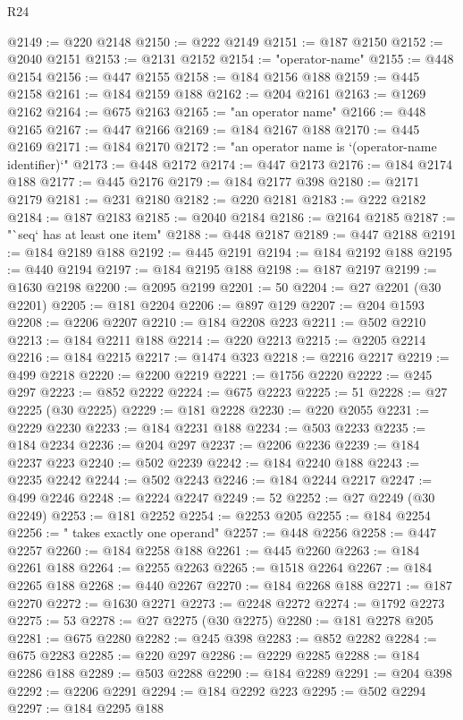 \begin{lexlean}{R24}
\begin{coremodule}
@2149 := @220 @2148
@2150 := @222 @2149
@2151 := @187 @2150
@2152 := @2040 @2151
@2153 := @2131 @2152
@2154 := "operator-name"
@2155 := @448 @2154
@2156 := @447 @2155
@2158 := @184 @2156 @188
@2159 := @445 @2158
@2161 := @184 @2159 @188
@2162 := @204 @2161
@2163 := @1269 @2162
@2164 := @675 @2163
@2165 := "an operator name"
@2166 := @448 @2165
@2167 := @447 @2166
@2169 := @184 @2167 @188
@2170 := @445 @2169
@2171 := @184 @2170
@2172 := "an operator name is `(operator-name identifier)`"
@2173 := @448 @2172
@2174 := @447 @2173
@2176 := @184 @2174 @188
@2177 := @445 @2176
@2179 := @184 @2177 @398
@2180 := @2171 @2179
@2181 := @231 @2180
@2182 := @220 @2181
@2183 := @222 @2182
@2184 := @187 @2183
@2185 := @2040 @2184
@2186 := @2164 @2185
@2187 := "`seq` has at least one item"
@2188 := @448 @2187
@2189 := @447 @2188
@2191 := @184 @2189 @188
@2192 := @445 @2191
@2194 := @184 @2192 @188
@2195 := @440 @2194
@2197 := @184 @2195 @188
@2198 := @187 @2197
@2199 := @1630 @2198
@2200 := @2095 @2199
@2201 := 50
@2204 := @27 @2201 (@30 @2201)
@2205 := @181 @2204
@2206 := @897 @129
@2207 := @204 @1593
@2208 := @2206 @2207
@2210 := @184 @2208 @223
@2211 := @502 @2210
@2213 := @184 @2211 @188
@2214 := @220 @2213
@2215 := @2205 @2214
@2216 := @184 @2215
@2217 := @1474 @323
@2218 := @2216 @2217
@2219 := @499 @2218
@2220 := @2200 @2219
@2221 := @1756 @2220
@2222 := @245 @297
@2223 := @852 @2222
@2224 := @675 @2223
@2225 := 51
@2228 := @27 @2225 (@30 @2225)
@2229 := @181 @2228
@2230 := @220 @2055
@2231 := @2229 @2230
@2233 := @184 @2231 @188
@2234 := @503 @2233
@2235 := @184 @2234
@2236 := @204 @297
@2237 := @2206 @2236
@2239 := @184 @2237 @223
@2240 := @502 @2239
@2242 := @184 @2240 @188
@2243 := @2235 @2242
@2244 := @502 @2243
@2246 := @184 @2244 @2217
@2247 := @499 @2246
@2248 := @2224 @2247
@2249 := 52
@2252 := @27 @2249 (@30 @2249)
@2253 := @181 @2252
@2254 := @2253 @205
@2255 := @184 @2254
@2256 := " takes exactly one operand"
@2257 := @448 @2256
@2258 := @447 @2257
@2260 := @184 @2258 @188
@2261 := @445 @2260
@2263 := @184 @2261 @188
@2264 := @2255 @2263
@2265 := @1518 @2264
@2267 := @184 @2265 @188
@2268 := @440 @2267
@2270 := @184 @2268 @188
@2271 := @187 @2270
@2272 := @1630 @2271
@2273 := @2248 @2272
@2274 := @1792 @2273
@2275 := 53
@2278 := @27 @2275 (@30 @2275)
@2280 := @181 @2278 @205
@2281 := @675 @2280
@2282 := @245 @398
@2283 := @852 @2282
@2284 := @675 @2283
@2285 := @220 @297
@2286 := @2229 @2285
@2288 := @184 @2286 @188
@2289 := @503 @2288
@2290 := @184 @2289
@2291 := @204 @398
@2292 := @2206 @2291
@2294 := @184 @2292 @223
@2295 := @502 @2294
@2297 := @184 @2295 @188

\end{coremodule}
\end{lexlean}
